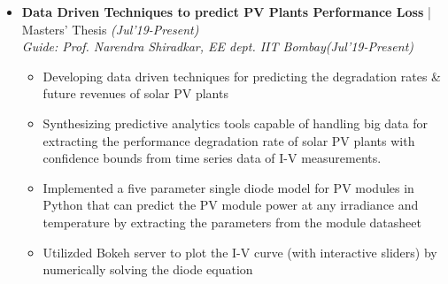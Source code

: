 \documentclass[a4paper, 10pt]{article}
\newcommand{\isep}{-2 pt}
\begin{document}
\begin{itemize} \itemsep \isep 
\vspace{-0.0cm}

\item \textbf{\large Data Driven Techniques to predict PV Plants Performance Loss} | Masters' Thesis \hfill \emph{(Jul'19-Present)}\\
 \textit{Guide: Prof. Narendra Shiradkar, EE dept. IIT Bombay}\hfill{\em{(Jul'19-Present)}}\\
	\begin{itemize}\itemsep \isep
	\vspace{-0.7cm}
		\item Developing data driven techniques for predicting the degradation rates \& future revenues of solar PV plants
\item Synthesizing predictive analytics tools capable of handling big data for extracting the performance degradation rate of solar PV plants with confidence bounds from time series data of I-V measurements.
		\item  Implemented a five parameter single diode model for PV modules in Python that can predict the PV module power at any irradiance and temperature by extracting the parameters from the module datasheet
	\item Utilizded Bokeh server to plot the I-V curve (with interactive sliders) by numerically solving the diode equation
    \end{itemize}


\end{itemize}
\end{document}
